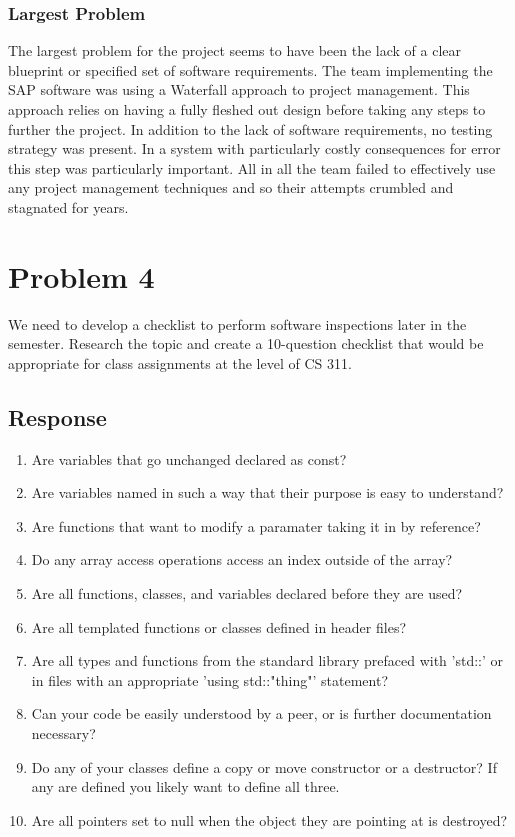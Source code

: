 \documentclass{article}
\begin{document}
  \subsubsection{Largest Problem}
    The largest problem for the project seems to have been the lack of a clear blueprint
    or specified set of software requirements. The team implementing the SAP
    software was using a Waterfall approach to project management. This approach
    relies on having a fully fleshed out design before taking any steps to further the
    project. In addition to the lack of software requirements, no testing strategy was present.
    In a system with particularly costly consequences for error this step was particularly important.
    All in all the team failed to effectively use any project management techniques and so their
    attempts crumbled and stagnated for years.

\section{Problem 4}
  We need to develop a checklist to perform software inspections later in the semester.
  Research the topic and create a 10-question checklist that would be appropriate for class assignments at the level of CS 311.
  \subsection{Response}
  \begin{enumerate}
    \item Are variables that go unchanged declared as const?
    \item Are variables named in such a way that their purpose is easy to understand?
    \item Are functions that want to modify a paramater taking it in by reference?
    \item Do any array access operations access an index outside of the array?
    \item Are all functions, classes, and variables declared before they are used?
    \item Are all templated functions or classes defined in header files?
    \item Are all types and functions from the standard library prefaced with
          'std::' or in files with an appropriate 'using std::"thing"' statement?
    \item Can your code be easily understood by a peer, or is further documentation necessary?
    \item Do any of your classes define a copy or move constructor or a destructor? If any are defined you likely want to define all three.
    \item Are all pointers set to null when the object they are pointing at is destroyed?
  \end{enumerate}
\end{document}
